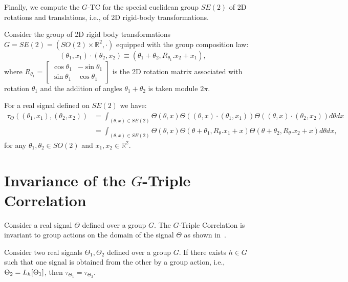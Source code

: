Finally, we compute the $G$-TC for the special euclidean group $SE(2)$ of 2D rotations and translations, i.e., of 2D rigid-body transformations.


\begin{example}
Consider the group of 2D rigid body transformations $G = SE(2) = (SO(2) \times \mathbb{R}^2, \cdot)$ equipped with the group composition law:
\begin{equation}
    (\theta_1, x_1) \cdot (\theta_2, x_2)
    \equiv
    (\theta_1 + \theta_2, R_{\theta_1}.x_2 + x_1),
\end{equation}
where $R_{\theta_1} = \begin{bmatrix}
    \cos \theta_1 & -\sin \theta_1 \\
    \sin \theta_1 & \cos \theta_1
\end{bmatrix}$ is the 2D rotation matrix associated with rotation $\theta_1$ and the addition of angles $\theta_1 + \theta_2$ is taken module $2\pi$.

For a real signal defined on $SE(2)$ we have:
\begin{align*}
    \tau_\Theta((\theta_1, x_1), (\theta_2, x_2))
        &= \int_{(\theta, x) \in SE(2)} \Theta(\theta, x) \Theta\left((\theta, x) \cdot (\theta_1, x_1)\right) \Theta\left((\theta, x) \cdot (\theta_2, x_2)\right)d\theta dx \\
        &= \int_{(\theta, x) \in SE(2)} \Theta(\theta, x) \Theta\left(\theta+\theta_1, R_\theta.x_1+x\right) \Theta\left(\theta +\theta_2, R_\theta.x_2 + x\right)d\theta dx,
\end{align*}
for any $\theta_1, \theta_2 \in SO(2)$ and $x_1, x_2 \in \mathbb{R}^2$.
\end{example}


\section{Invariance of the $G$-Triple Correlation}\label{sec:g-tc-invariance}

Consider a real signal $\Theta$ defined over a group $G$. The $G$-Triple Correlation is invariant to group actions on the domain of the signal $\Theta$ as shown in~\cite{KakaralaTriple}.

\begin{proposition}
    Consider two real signals $\Theta_1, \Theta_2$ defined over a group $G$. If there exists $h \in G$ such that one signal is obtained from the other by a group action, i.e., $\Theta_2 = L_h[\Theta_1]$, then $\tau_{\Theta_1} = \tau_{\Theta_2}$.
\end{proposition}

